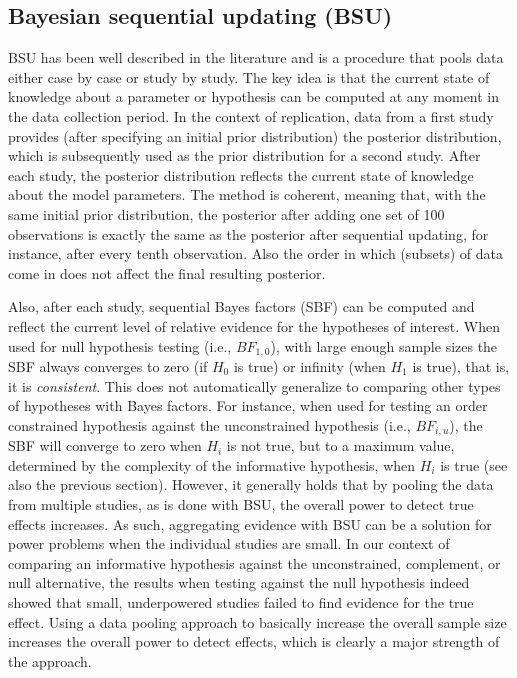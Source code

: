 \documentclass[11pt,reqno]{article}
\begin{document}
\subsection{Bayesian sequential updating (BSU)}
BSU has been well described in the literature \citep[e.g.,][]{schonbrodt_sequential_2017, verhagen_bayesian_2014} and is a procedure that pools data either case by case or study by study. The key idea is that the current state of knowledge about a parameter or hypothesis can be computed at any moment in the data collection period. In the context of replication, data from a first study provides (after specifying an initial prior distribution) the posterior distribution, which is subsequently used as the prior distribution for a second study. After each study, the posterior distribution reflects the current state of knowledge about the model parameters. The method is coherent, meaning that, with the same initial prior distribution, the posterior after adding one set of 100 observations is exactly the same as the posterior after sequential updating, for instance, after every tenth observation. Also the order in which (subsets) of data come in does not affect the final resulting posterior.

Also, after each study, sequential Bayes factors (SBF) can be computed and reflect the current level of relative evidence for the hypotheses of interest. When used for null hypothesis testing (i.e., $BF_{1,0}$), with large enough sample sizes the SBF always converges to zero (if $H_0$ is true) or infinity (when $H_1$ is true), that is, it is \emph{consistent}. This does not automatically generalize to comparing other types of hypotheses with Bayes factors. For instance, when used for testing an order constrained hypothesis against the unconstrained hypothesis (i.e., $BF_{i,u}$), the SBF will converge to zero when $H_i$ is not true, but to a maximum value, determined by the complexity of the informative hypothesis, when $H_i$ is true (see also the previous section). However, it generally holds that by pooling the data from multiple studies, as is done with BSU, the overall power to detect true effects increases. As such, aggregating evidence with BSU can be a solution for power problems when the individual studies are small. In our context of comparing an informative hypothesis against the unconstrained, complement, or null alternative, the results when testing against the null hypothesis indeed showed that small, underpowered studies failed to find evidence for the true effect. Using a data pooling approach to basically increase the overall sample size increases the overall power to detect effects, which is clearly a major strength of the approach.
\end{document}
